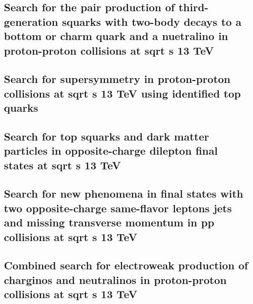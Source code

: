 \documentclass[a4paper, 11pt, twoside, openright]{report}
\begin{document}
\subsection{Search for the pair production of third-generation squarks with two-body decays to a bottom or charm quark and a nuetralino in proton-proton collisions at sqrt s 13 TeV}


\subsection{Search for supersymmetry in proton-proton collisions at sqrt s 13 TeV using identified top quarks}


\subsection{Search for top squarks and dark matter particles in opposite-charge dilepton final states at sqrt s 13 TeV}


\subsection{Search for new phenomena in final states with two opposite-charge same-flavor leptons jets and missing transverse momentum in pp collisions at sqrt s 13 TeV}


\subsection{Combined search for electroweak production of charginos and neutralinos in proton-proton collisions at sqrt s 13 TeV}

\end{document}
